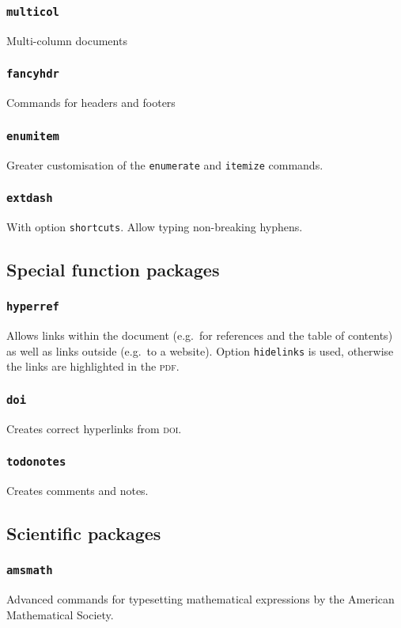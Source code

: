 \documentclass{article}
\begin{document}
\subsubsection{\texttt{multicol}}
Multi-column documents
\subsubsection{\texttt{fancyhdr}}
Commands for headers and footers
\subsubsection{\texttt{enumitem}}
Greater customisation of the \texttt{enumerate} and \texttt{itemize} commands.
\subsubsection{\texttt{extdash}}
With option \texttt{shortcuts}. Allow typing non-breaking hyphens.

\subsection{Special function packages}
\subsubsection{\texttt{hyperref}}
Allows links within the document (e.g.\ for references and the table of contents) as well as links outside (e.g.\ to a website). Option \texttt{hidelinks} is used, otherwise the links are highlighted in the \textsc{pdf}.
\subsubsection{\texttt{doi}}
Creates correct hyperlinks from \textsc{doi}.
\subsubsection{\texttt{todonotes}}
Creates comments and notes.

\subsection{Scientific packages}
\subsubsection{\texttt{amsmath}}
Advanced commands for typesetting mathematical expressions by the American Mathematical Society.
\end{document}
